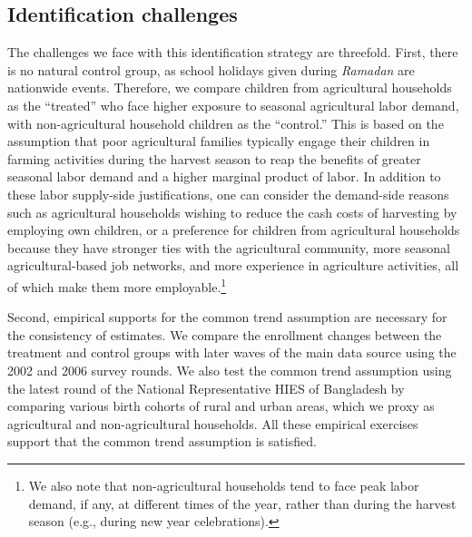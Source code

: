 \documentclass[12pt,letterpaper]{article}\usepackage[margin=1in]{geometry}
\newcommand{\0}{\ensuremath{\mbox{\boldmath $0$}}}
\begin{document}
\subsection{Identification challenges \label{sec.identification_challange}}

The challenges we face with this identification strategy are threefold. First, there is no natural control group, as school holidays given during \textit{Ramadan} are nationwide events. Therefore, we compare children from agricultural households as the ``treated'' who face higher exposure to seasonal agricultural labor demand, with non-agricultural household children as the ``control.'' This is based on the assumption that poor agricultural families typically engage their children in farming activities during the harvest season to reap the benefits of greater seasonal labor demand and a higher marginal product of labor. In addition to these labor supply-side justifications, one can consider the demand-side reasons such as agricultural households wishing to reduce the cash costs of harvesting by employing own children, or a preference for children from agricultural households because they have stronger ties with the agricultural community, more seasonal agricultural-based job networks, and more experience in agriculture activities, all of which make them more employable.\footnote{We also note that non-agricultural households tend to face peak labor demand, if any, at different times of the year, rather than during the harvest season (e.g., during new year celebrations). }

Second, empirical supports for the common trend assumption are necessary for the consistency of estimates. We compare the enrollment changes between the treatment and control groups with later waves of the main data source using the 2002 and 2006 survey rounds. We also test the common trend assumption using the latest round of the National Representative HIES of Bangladesh by comparing various birth cohorts of rural and urban areas, which we proxy as agricultural and non-agricultural households.  All these empirical exercises support that the common trend assumption is satisfied.  
 
\end{document}
